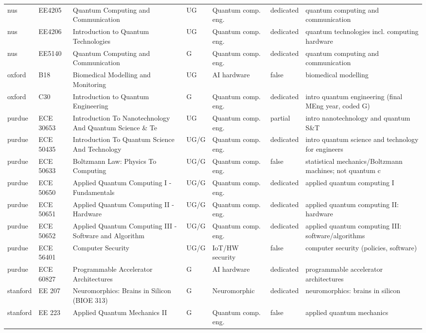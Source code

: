 \documentclass[10pt]{article}
\begin{document}
\begin{longtable}{@{}llL{4.6cm}llll@{}}
nus & EE4205 & Quantum Computing and Communication & UG & Quantum comp. eng. & dedicated & quantum computing and communication \\
nus & EE4206 & Introduction to Quantum Technologies & UG & Quantum comp. eng. & dedicated & quantum technologies incl. computing hardware \\
nus & EE5140 & Quantum Computing and Communication & G & Quantum comp. eng. & dedicated & quantum computing and communication \\
oxford & B18 & Biomedical Modelling and Monitoring & UG & AI hardware & false & biomedical modelling \\
oxford & C30 & Introduction to Quantum Engineering & G & Quantum comp. eng. & dedicated & intro quantum engineering (final MEng year, coded G) \\
purdue & ECE 30653 & Introduction To Nanotechnology And Quantum Science \& Te & UG & Quantum comp. eng. & partial & intro nanotechnology and quantum S\&T \\
purdue & ECE 50435 & Introduction To Quantum Science And Technology & UG/G & Quantum comp. eng. & dedicated & intro quantum science and technology for engineers \\
purdue & ECE 50633 & Boltzmann Law: Physics To Computing & UG/G & Quantum comp. eng. & false & statistical mechanics/Boltzmann machines; not quantum c \\
purdue & ECE 50650 & Applied Quantum Computing I - Fundamentals & UG/G & Quantum comp. eng. & dedicated & applied quantum computing I \\
purdue & ECE 50651 & Applied Quantum Computing II - Hardware & UG/G & Quantum comp. eng. & dedicated & applied quantum computing II: hardware \\
purdue & ECE 50652 & Applied Quantum Computing III - Software and Algorithm & UG/G & Quantum comp. eng. & dedicated & applied quantum computing III: software/algorithms \\
purdue & ECE 56401 & Computer Security & UG/G & IoT/HW security & false & computer security (policies, software) \\
purdue & ECE 60827 & Programmable Accelerator Architectures & G & AI hardware & dedicated & programmable accelerator architectures \\
stanford & EE 207 & Neuromorphics: Brains in Silicon (BIOE 313) & G & Neuromorphic & dedicated & neuromorphics: brains in silicon \\
stanford & EE 223 & Applied Quantum Mechanics II & G & Quantum comp. eng. & false & applied quantum mechanics \\

\end{longtable}
\end{document}
